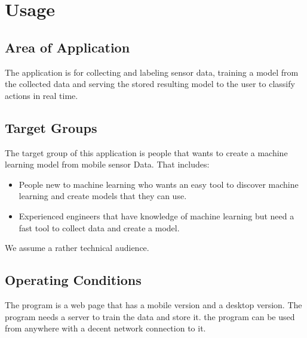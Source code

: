 \section{Usage}
\subsection{Area of Application}
The application is for collecting and labeling sensor data, training a model from the collected data and serving the stored resulting model to the user to classify actions in real time.

\subsection{Target Groups}
The target group of this application is people that wants to create a machine learning model from mobile sensor Data.
That includes: 
\begin{itemize}
    \item People new to machine learning who wants an easy tool to discover machine learning and create models that they can use.
    \item Experienced engineers that have knowledge of machine learning but need a fast tool to collect data and create a model.
\end{itemize}
We assume a rather technical audience.

\subsection{Operating Conditions} %
The program is a web page that has a mobile version and a desktop version. The program needs a server to train the data and store it. the program can be used from anywhere with a decent network connection to it.

